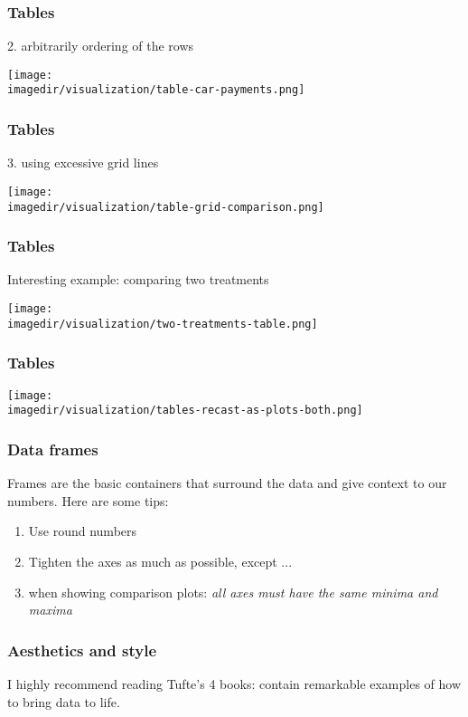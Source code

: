\begin{frame}\frametitle{Tables}
	2. arbitrarily ordering of the rows 
	\begin{center}
		\texttt{[image: \\imagedir/visualization/table-car-payments.png]}
	\end{center}
\end{frame}

\begin{frame}\frametitle{Tables}
	3. using excessive grid lines 
	\begin{center}
		\texttt{[image: \\imagedir/visualization/table-grid-comparison.png]}
	\end{center}
\end{frame}

\begin{frame}\frametitle{Tables}
	Interesting example: comparing two treatments
	\begin{center}
		\texttt{[image: \\imagedir/visualization/two-treatments-table.png]}
	\end{center}
\end{frame}

\begin{frame}\frametitle{Tables}
	\begin{center}
		\texttt{[image: \\imagedir/visualization/tables-recast-as-plots-both.png]}
	\end{center}	
\end{frame}

\begin{frame}\frametitle{Data frames}
	
	Frames are the basic containers that surround the data and give context to our numbers. Here are some tips:
	\begin{enumerate}
		\item	Use round numbers 
		\item	Tighten the axes as much as possible, except ... 
		\item	when showing comparison plots: \emph{all axes must have the same minima and maxima} 
	\end{enumerate}
\end{frame}

\begin{frame}\frametitle{Aesthetics and style}
	
	I highly recommend reading Tufte's 4 books: contain remarkable examples of how to bring data to life.
\end{frame}

